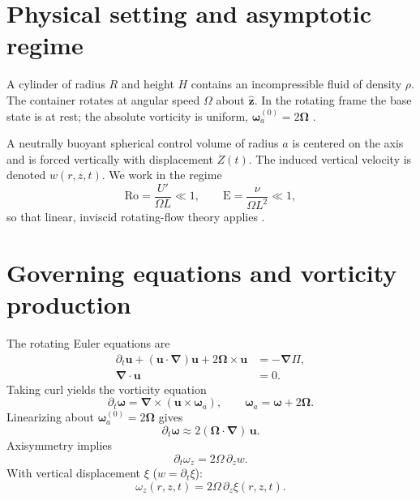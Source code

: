 \documentclass[12pt]{article}
\newcommand{\bU}{\boldsymbol{u}}
\newcommand{\bW}{\boldsymbol{\omega}}
\newcommand{\bOm}{\boldsymbol{\Omega}}
\newcommand{\ez}{\hat{\boldsymbol{z}}}
\newcommand{\grad}{\boldsymbol{\nabla}}
\newcommand{\curl}{\boldsymbol{\nabla}\!\times}
\newcommand{\divg}{\boldsymbol{\nabla}\!\cdot}
\newcommand{\p}{\partial}
\begin{document}
    \section{Physical setting and asymptotic regime}
    A cylinder of radius \(R\) and height \(H\) contains an incompressible fluid of density \(\rho\). The container rotates at angular speed \(\Omega\) about \(\ez\). In the rotating frame the base state is at rest; the absolute vorticity is uniform, \(\bW_a^{(0)}=2\bOm\) \cite{Batchelor1967,Greenspan1968}.

    A neutrally buoyant spherical control volume of radius \(a\) is centered on the axis and is forced vertically with displacement \(Z(t)\). The induced vertical velocity is denoted \(w(r,z,t)\). We work in the regime
    \[
        \mathrm{Ro}=\frac{U'}{\Omega L}\ll1,\qquad
        \mathrm{E}=\frac{\nu}{\Omega L^2}\ll1,
    \]
    so that linear, inviscid rotating-flow theory applies \cite{Batchelor1967,Greenspan1968,Vallis2017}.

    \section{Governing equations and vorticity production}
    The rotating Euler equations are
    \begin{align}
        \p_t \bU + (\bU\!\cdot\!\grad)\bU + 2\bOm\times\bU &= -\grad \Pi, \label{eq:NSrot}\\
        \divg \bU &= 0. \label{eq:incomp}
    \end{align}
    Taking curl yields the vorticity equation \cite{Batchelor1967,Vallis2017}
    \begin{equation}
        \p_t \bW = \curl(\bU\times \bW_a),\qquad \bW_a=\bW+2\bOm. \label{eq:vortgen}
    \end{equation}
    Linearizing about \(\bW_a^{(0)}=2\bOm\) gives
    \begin{equation}
        \p_t \bW \approx 2(\bOm\!\cdot\!\grad)\,\bU. \label{eq:vortlin}
    \end{equation}
    Axisymmetry implies
    \begin{equation}
        \boxed{\;\p_t \omega_z = 2\Omega\,\p_z w.\;} \label{eq:key}
    \end{equation}
    With vertical displacement \(\xi\) (\(w=\p_t\xi\)):
    \begin{equation}
        \boxed{\;\omega_z(r,z,t) = 2\Omega\,\p_z \xi(r,z,t).\;} \label{eq:omegaxi}
    \end{equation}
\end{document}
